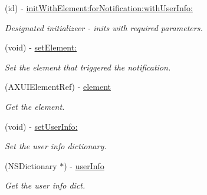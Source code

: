 \begin{DoxyCompactItemize}
\item 
(id) -\/ \hyperlink{interface_g_d_accessibility_notification_a79fa1997f1e26f0f63f4b2e16ec4a7b8}{initWithElement:forNotification:withUserInfo:}
\begin{DoxyCompactList}\small\item\em Designated initializeer -\/ inits with required parameters. \item\end{DoxyCompactList}\item 
(void) -\/ \hyperlink{interface_g_d_accessibility_notification_a2dcdd48bb0572d48810026fed1577b9c}{setElement:}
\begin{DoxyCompactList}\small\item\em Set the element that triggered the notification. \item\end{DoxyCompactList}\item 
\hypertarget{interface_g_d_accessibility_notification_a42032ceba7149feb17257ecf48d909b6}{
(AXUIElementRef) -\/ \hyperlink{interface_g_d_accessibility_notification_a42032ceba7149feb17257ecf48d909b6}{element}}
\label{interface_g_d_accessibility_notification_a42032ceba7149feb17257ecf48d909b6}

\begin{DoxyCompactList}\small\item\em Get the element. \item\end{DoxyCompactList}\item 
(void) -\/ \hyperlink{interface_g_d_accessibility_notification_ac44eebad792940c9f430ab0274f0dedf}{setUserInfo:}
\begin{DoxyCompactList}\small\item\em Set the user info dictionary. \item\end{DoxyCompactList}\item 
\hypertarget{interface_g_d_accessibility_notification_a9059901212d03aa11d436831be560777}{
(NSDictionary $\ast$) -\/ \hyperlink{interface_g_d_accessibility_notification_a9059901212d03aa11d436831be560777}{userInfo}}
\label{interface_g_d_accessibility_notification_a9059901212d03aa11d436831be560777}

\begin{DoxyCompactList}\small\item\em Get the user info dict. \item\end{DoxyCompactList}\end{DoxyCompactItemize}
